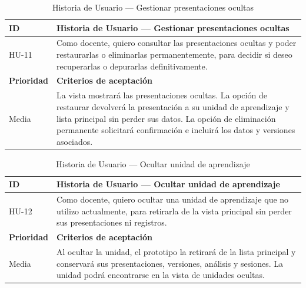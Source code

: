 \documentclass[11pt]{article}
\newcommand{\ttstyle}{%
  \small
  \setlength{\tabcolsep}{6pt}%
  \renewcommand{\arraystretch}{1.25}%
  \arrayrulecolor{azulprofundo}%
}
\newcommand{\hairrule}{%
  \arrayrulecolor{azulregla}\midrule[0.3pt]\arrayrulecolor{azulprofundo}%
}
\begin{document}
\begin{table}[H]
    \centering
    \renewcommand{\arraystretch}{1.2}
    \ttstyle
    \begin{tabular}{p{2.5cm}p{11cm}}
        \toprule
        \textbf{ID} & \textbf{Historia de Usuario --- Gestionar presentaciones ocultas} \\
        \midrule
        HU-11 & Como docente, quiero consultar las presentaciones ocultas y poder restaurarlas o eliminarlas permanentemente, para decidir si deseo recuperarlas o depurarlas definitivamente. \\
        \hairrule
        \textbf{Prioridad} & \textbf{Criterios de aceptación} \\
        \hairrule
        Media & La vista mostrará las presentaciones ocultas. La opción de restaurar devolverá la presentación a su unidad de aprendizaje y lista principal sin perder sus datos. La opción de eliminación permanente solicitará confirmación e incluirá los datos y versiones asociados. \\
        \bottomrule
    \end{tabular}
    \caption{Historia de Usuario --- Gestionar presentaciones ocultas}
    \label{tab:hu-gestionar-presentaciones-ocultas}
\end{table}

\begin{table}[H]
    \centering
    \renewcommand{\arraystretch}{1.2}
    \ttstyle
    \begin{tabular}{p{2.5cm}p{11cm}}
        \toprule
        \textbf{ID} & \textbf{Historia de Usuario --- Ocultar unidad de aprendizaje} \\
        \midrule
        HU-12 & Como docente, quiero ocultar una unidad de aprendizaje que no utilizo actualmente, para retirarla de la vista principal sin perder sus presentaciones ni registros. \\
        \hairrule
        \textbf{Prioridad} & \textbf{Criterios de aceptación} \\
        \hairrule
        Media & Al ocultar la unidad, el prototipo la retirará de la lista principal y conservará sus presentaciones, versiones, análisis y sesiones. La unidad podrá encontrarse en la vista de unidades ocultas. \\
        \bottomrule
    \end{tabular}
    \caption{Historia de Usuario --- Ocultar unidad de aprendizaje}
    \label{tab:hu-ocultar-unidad}
\end{table}
\end{document}
